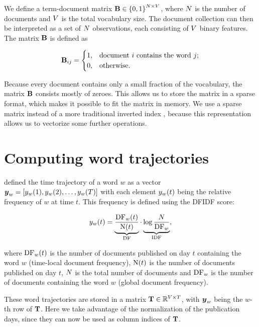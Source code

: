 We define a term-document matrix $\mathbf{B} \in \left\{ 0, 1 \right\}^{N \times V}$, where $N$ is the number of documents and $V$ is the total vocabulary size. The document collection can then be interpreted as a set of $N$ observations, each consisting of $V$ binary features. The matrix $\mathbf{B}$ is defined as

\begin{equation} \label{eq:bow-matrix}
	\mathbf{B}_{ij} =
	\begin{cases}
		1, & \text{document}~i~\text{contains the word}~j \text{;} \\
		0, & \text{otherwise.}
	\end{cases}
\end{equation}

Because every document contains only a small fraction of the vocabulary, the matrix $\mathbf{B}$ consists mostly of zeroes. This allows us to store the matrix in a sparse format, which makes it possible to fit the matrix in memory. We use a sparse matrix instead of a more traditional inverted index \cite{information-retrieval}, because this representation allows us to vectorize some further operations.


\section{Computing word trajectories}
\cite{event-detection} defined the time trajectory of a word $w$ as a vector\\ $\vect{\traj}_{w} = \left[ \traj_{w}(1), \traj_{w}(2), \dots, \traj_{w}(\streamlen) \right]$ with each element $y_{w}(t)$ being the relative frequency of $w$ at time $t$. This frequency is defined using the DFIDF score:

\begin{equation}
	y_{w}(t) = \underbrace{\frac{\text{DF}_{w}(t)}{\text{N}(t)}}_{\text{DF}} \cdot \underbrace{\log{\frac{N}{\text{DF}_{w}}}}_{\text{IDF}},
\end{equation}

where $\text{DF}_{w}(t)$ is the number of documents published on day $t$ containing the word $w$ (time-local document frequency), $\text{N}(t)$ is the number of documents published on day $t$, $N$ is the total number of documents and $\text{DF}_{w}$ is the number of documents containing the word $w$ (global document frequency).

These word trajectories are stored in a matrix $\mathbf{T} \in \mathbb{R}^{V \times T}$, with $\vect{\traj}_w$ being the $w$-th row of $\mathbf{T}$. Here we take advantage of the normalization of the publication days, since they can now be used as column indices of $\mathbf{T}$.


